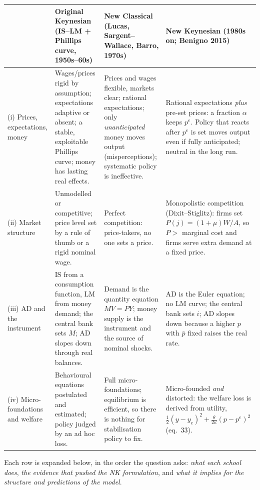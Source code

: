\documentclass[11pt, a4paper]{article}
\newcommand{\pbar}{\bar p}
\begin{document}
\begin{center}
\small
\renewcommand{\arraystretch}{1.25}
\begin{tabular}{@{}>{\raggedright\arraybackslash}p{2.1cm}
                >{\raggedright\arraybackslash}p{4.2cm}
                >{\raggedright\arraybackslash}p{4.2cm}
                >{\raggedright\arraybackslash}p{4.3cm}@{}}
\toprule
& \textbf{Original Keynesian} (IS--LM + Phillips curve, 1950s--60s)
& \textbf{New Classical} (Lucas, Sargent--Wallace, Barro, 1970s)
& \textbf{New Keynesian} (1980s on; Benigno 2015) \\
\midrule
(i) Prices, expectations, money
& Wages/prices rigid by assumption; expectations adaptive or absent; a stable, exploitable
  Phillips curve; money has lasting real effects.
& Prices and wages flexible, markets clear; rational expectations; only \emph{unanticipated}
  money moves output (misperceptions); systematic policy is ineffective.
& Rational expectations \emph{plus} pre-set prices: a fraction $\alpha$ keeps $p^e$.
  Policy that reacts after $p^e$ is set moves output even if fully anticipated; neutral in
  the long run. \\
(ii) Market structure
& Unmodelled or competitive; price level set by a rule of thumb or a rigid nominal wage.
& Perfect competition: price-takers, no one sets a price.
& Monopolistic competition (Dixit--Stiglitz): firms set $P(j)=(1+\mu)W/A$, so $P>$ marginal
  cost and firms serve extra demand at a fixed price. \\
(iii) AD and the instrument
& IS from a consumption function, LM from money demand; the central bank sets $M$; AD
  slopes down through real balances.
& Demand is the quantity equation $MV=PY$; money supply is the instrument and the source
  of nominal shocks.
& AD is the Euler equation; no LM curve; the central bank sets $i$; AD slopes down because
  a higher $p$ with $\pbar$ fixed raises the real rate. \\
(iv) Micro-foundations and welfare
& Behavioural equations postulated and estimated; policy judged by an ad hoc loss.
& Full micro-foundations; equilibrium is efficient, so there is nothing for stabilisation
  policy to fix.
& Micro-founded \emph{and} distorted: the welfare loss is derived from utility,
  $\tfrac12(y-y_e)^2+\tfrac{\theta}{2\kappa}(p-p^e)^2$ (eq.\ 33). \\
\bottomrule
\end{tabular}
\end{center}

Each row is expanded below, in the order the question asks: \emph{what each school does},
\emph{the evidence that pushed the NK formulation}, and \emph{what it implies for the
structure and predictions of the model}.
\end{document}
